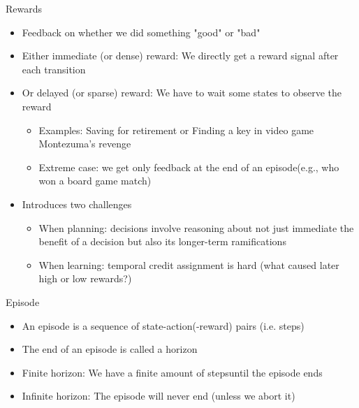\documentclass[aspectratio=169]{../latex_main/tntbeamer}  %
\begin{document}
\begin{frame}[c]{Rewards}
	\begin{itemize}
		\item Feedback on whether we did something "good" or "bad"
		\smallskip
		\pause
		\item Either immediate (or dense) reward: We directly get a reward signal after each transition
		\item Or delayed (or sparse) reward: We have to wait some states to observe the reward
		\begin{itemize}
			\item Examples: Saving for retirement or Finding a key in video game Montezuma’s revenge
			\item Extreme case: we get only feedback at the end of an episode\newline (e.g., who won a board game match)
		\end{itemize}
        \pause
		\item Introduces two challenges
		\begin{itemize}
			\item When planning: decisions involve reasoning about not just immediate
			the benefit of a decision but also its longer-term ramifications
			\item When learning: temporal credit assignment is hard (what caused later
			high or low rewards?)
		\end{itemize}
	\end{itemize}
\end{frame}
\begin{frame}[c]{Episode}
	\begin{itemize}
		\item An episode is a sequence of state-action(-reward) pairs (i.e. steps)
		\item The end of an episode is called a horizon
		\smallskip
		\pause
		\item Finite horizon: We have a finite amount of steps\newline until the episode ends
		\item Infinite horizon: The episode will never end (unless we abort it)
	\end{itemize}
\end{frame}
\end{document}
